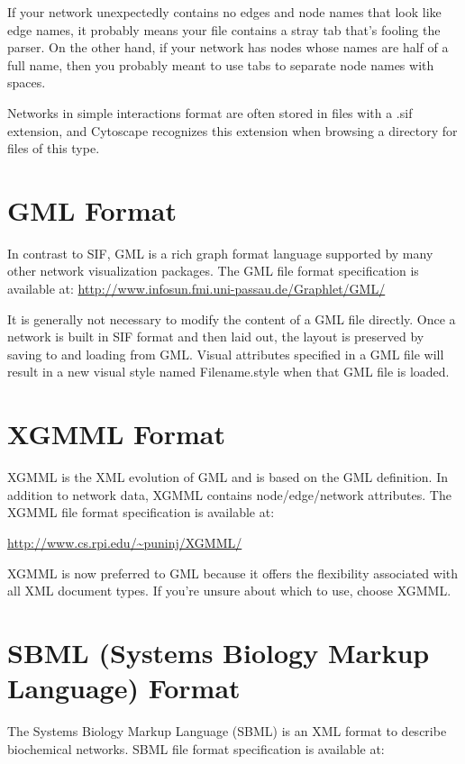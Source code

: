  If your network unexpectedly contains no edges and node names that look like edge names, it probably means your file contains a stray tab that's fooling the parser. On the other hand, if your network has nodes whose names are half of a full name, then you probably meant to use tabs to separate node names with spaces. 

 Networks in simple interactions format are often stored in files with a .sif extension, and Cytoscape recognizes this extension when browsing a directory for files of this type. 

\section{GML Format}
 In contrast to SIF, GML is a rich graph format language supported by many other network visualization packages. The GML file format specification is available at: \url{http://www.infosun.fmi.uni-passau.de/Graphlet/GML/}

 It is generally not necessary to modify the content of a GML file directly. Once a network is built in SIF format and then laid out, the layout is preserved by saving to and loading from GML. Visual attributes specified in a GML file will result in a new visual style named Filename.style when that GML file is loaded. 

\section{XGMML Format}


 XGMML is the XML evolution of GML and is based on the GML definition. In addition to network data, XGMML contains node/edge/network attributes. The XGMML file format specification is available at: 


 \url{http://www.cs.rpi.edu/~puninj/XGMML/}


 XGMML is now preferred to GML because it offers the flexibility associated with all XML document types. If you're unsure about which to use, choose XGMML. 


 
\section{SBML (Systems Biology Markup Language) Format}


 The Systems Biology Markup Language (SBML) is an XML format to describe biochemical networks. SBML file format specification is available at: 


